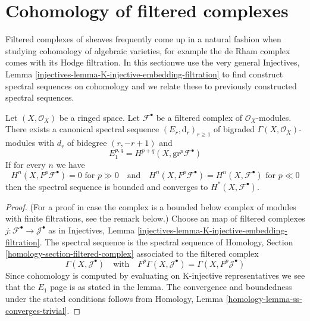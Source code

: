 \section{Cohomology of filtered complexes}
\label{section-cohomology-filtered-object}

\noindent
Filtered complexes of sheaves frequently come up in a natural fashion
when studying cohomology of algebraic varieties, for example the de Rham
complex comes with its Hodge filtration. In this sectionwe use the very general
Injectives, Lemma \ref{injectives-lemma-K-injective-embedding-filtration}
to find construct spectral sequences on cohomology and we relate these to
previously constructed spectral sequences.

\begin{lemma}
\label{lemma-spectral-sequence-filtered-object}
Let $(X, \mathcal{O}_X)$ be a ringed space. Let $\mathcal{F}^\bullet$ be a
filtered complex of $\mathcal{O}_X$-modules. There exists a canonical
spectral sequence $(E_r, \text{d}_r)_{r \geq 1}$ of bigraded
$\Gamma(X, \mathcal{O}_X)$-modules with $d_r$ of bidegree $(r, -r + 1)$ and
$$
E_1^{p, q} = H^{p + q}(X, \text{gr}^p\mathcal{F}^\bullet)
$$
If for every $n$ we have
$$
H^n(X, F^p\mathcal{F}^\bullet) = 0\text{ for }p \gg 0
\quad\text{and}\quad
H^n(X, F^p\mathcal{F}^\bullet) = H^n(X, \mathcal{F}^\bullet)\text{ for }p \ll 0
$$
then the spectral sequence is bounded and converges to
$H^*(X, \mathcal{F}^\bullet)$.
\end{lemma}

\begin{proof}
(For a proof in case the complex is a bounded below complex
of modules with finite filtrations, see the remark below.)
Choose an map of filtered complexes
$j : \mathcal{F}^\bullet \to \mathcal{J}^\bullet$ as in
Injectives, Lemma
\ref{injectives-lemma-K-injective-embedding-filtration}.
The spectral sequence is the spectral sequence of
Homology, Section \ref{homology-section-filtered-complex}
associated to the filtered complex
$$
\Gamma(X, \mathcal{J}^\bullet)
\quad\text{with}\quad
F^p\Gamma(X, \mathcal{J}^\bullet) = \Gamma(X, F^p\mathcal{J}^\bullet)
$$
Since cohomology is computed by evaluating on K-injective representatives
we see that the $E_1$ page is as stated in the lemma.
The convergence and boundedness under the stated conditions
follows from Homology, Lemma \ref{homology-lemma-ss-converges-trivial}.
\end{proof}

